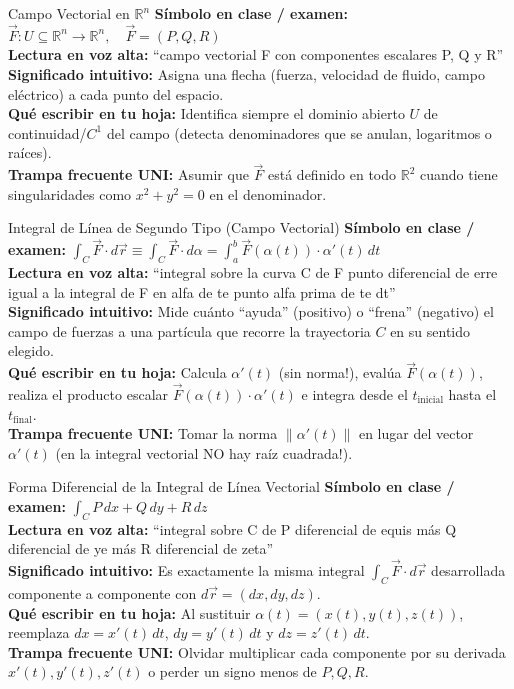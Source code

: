 \documentclass[11pt,a4paper]{article}
\begin{document}
\begin{definicionbox}{Campo Vectorial en $\mathbb{R}^n$}
\textbf{Símbolo en clase / examen:} $\vec{F} : U \subseteq \mathbb{R}^n \to \mathbb{R}^n, \quad \vec{F} = (P, Q, R)$\\[0.15cm]
\textbf{Lectura en voz alta:} ``campo vectorial F con componentes escalares P, Q y R''\\[0.12cm]
\textbf{Significado intuitivo:} Asigna una flecha (fuerza, velocidad de fluido, campo eléctrico) a cada punto del espacio.\\[0.12cm]
\textbf{Qué escribir en tu hoja:} Identifica siempre el dominio abierto $U$ de continuidad/$C^1$ del campo (detecta denominadores que se anulan, logaritmos o raíces).\\[0.12cm]
\textbf{Trampa frecuente UNI:} Asumir que $\vec{F}$ está definido en todo $\mathbb{R}^2$ cuando tiene singularidades como $x^2+y^2=0$ en el denominador.
\end{definicionbox}

\begin{definicionbox}{Integral de Línea de Segundo Tipo (Campo Vectorial)}
\textbf{Símbolo en clase / examen:} $\int_C \vec{F} \cdot d\vec{r} \equiv \int_C \vec{F} \cdot d\alpha = \int_a^b \vec{F}(\alpha(t)) \cdot \alpha'(t)\,dt$\\[0.15cm]
\textbf{Lectura en voz alta:} ``integral sobre la curva C de F punto diferencial de erre igual a la integral de F en alfa de te punto alfa prima de te dt''\\[0.12cm]
\textbf{Significado intuitivo:} Mide cuánto ``ayuda'' (positivo) o ``frena'' (negativo) el campo de fuerzas a una partícula que recorre la trayectoria $C$ en su sentido elegido.\\[0.12cm]
\textbf{Qué escribir en tu hoja:} Calcula $\alpha'(t)$ (sin norma!), evalúa $\vec{F}(\alpha(t))$, realiza el producto escalar $\vec{F}(\alpha(t))\cdot\alpha'(t)$ e integra desde el $t_{\text{inicial}}$ hasta el $t_{\text{final}}$.\\[0.12cm]
\textbf{Trampa frecuente UNI:} Tomar la norma $\|\alpha'(t)\|$ en lugar del vector $\alpha'(t)$ (en la integral vectorial NO hay raíz cuadrada!).
\end{definicionbox}

\begin{definicionbox}{Forma Diferencial de la Integral de Línea Vectorial}
\textbf{Símbolo en clase / examen:} $\int_C P\,dx + Q\,dy + R\,dz$\\[0.15cm]
\textbf{Lectura en voz alta:} ``integral sobre C de P diferencial de equis más Q diferencial de ye más R diferencial de zeta''\\[0.12cm]
\textbf{Significado intuitivo:} Es exactamente la misma integral $\int_C \vec{F}\cdot d\vec{r}$ desarrollada componente a componente con $d\vec{r} = (dx, dy, dz)$.\\[0.12cm]
\textbf{Qué escribir en tu hoja:} Al sustituir $\alpha(t)=(x(t),y(t),z(t))$, reemplaza $dx = x'(t)\,dt$, $dy = y'(t)\,dt$ y $dz = z'(t)\,dt$.\\[0.12cm]
\textbf{Trampa frecuente UNI:} Olvidar multiplicar cada componente por su derivada $x'(t), y'(t), z'(t)$ o perder un signo menos de $P, Q, R$.
\end{definicionbox}
\end{document}
